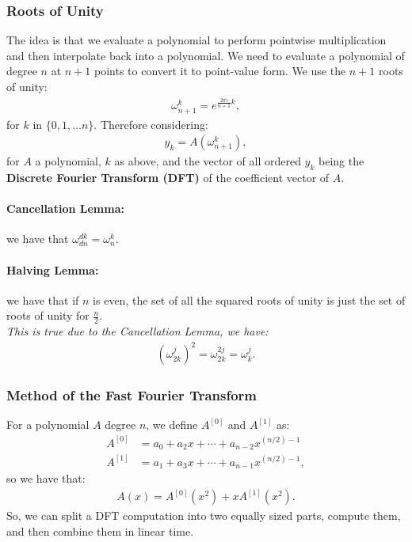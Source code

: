 \documentclass[a4paper, 12pt, twoside]{article}
\begin{document}
\subsubsection{Roots of Unity}

The idea is that we evaluate a polynomial to perform pointwise
multiplication and then interpolate back into a polynomial.
We need to evaluate a polynomial of degree $n$ at $n + 1$ points to
convert it to point-value form. We use the $n + 1$ roots of unity:
\begin{gather*}
  \omega_{n+1}^k = e^{\frac{2\pi i}{n + 1}k},
\end{gather*} for $k$ in $\{0, 1, \ldots n\}$. Therefore considering:
\begin{gather*}
  y_k = A(\omega_{n + 1}^k),
\end{gather*} for $A$ a polynomial, $k$ as above, and the vector of 
all ordered $y_k$ being the \textbf{Discrete Fourier Transform (DFT)} 
of the coefficient vector of $A$.

\paragraph{Cancellation Lemma:} we have that 
$\omega_{dn}^{dk} = \omega_{n}^{k}$.

\paragraph{Halving Lemma:} we have that if $n$ is even, the set of all
the squared roots of unity is just the set of roots of unity for $\frac{n}{2}$.
\\[\baselineskip]
\textit{This is true due to the Cancellation Lemma, we have:} \begin{gather*}
  (\omega_{2k}^j)^2 = \omega_{2k}^{2j} = \omega_{k}^j.
\end{gather*}

\subsubsection{Method of the Fast Fourier Transform}

For a polynomial $A$ degree $n$, 
we define $A^{[0]}$ and $A^{[1]}$ as: \begin{align*}
  A^{[0]} &= a_0 + a_2x + \cdots + a_{n - 2}x^{(n / 2) - 1} \\
  A^{[1]} &= a_1 + a_3x + \cdots + a_{n - 1}x^{(n / 2) - 1},
\end{align*} so we have that: \begin{gather*}
  A(x) = A^{[0]}(x^2) + xA^{[1]}(x^2).
\end{gather*} So, we can split a DFT computation into two
equally sized parts, compute them, and then combine them in linear time.
\end{document}

